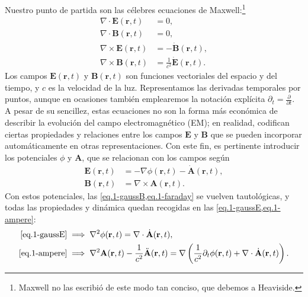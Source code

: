 Nuestro punto de partida son las célebres ecuaciones de Maxwell:\footnote{Maxwell no las escribió de este modo tan conciso, que debemos a Heaviside.}
\begin{subequations}
    \begin{align}
        \label{eq.1-gaussE}
        \nabla\cdot \mathbf{E}(\mathbf{r}, t) &= 0,\\
        \label{eq.1-gaussB}
        \nabla\cdot \mathbf{B}(\mathbf{r}, t) &= 0,\\
        \label{eq.1-faraday}
        \nabla\times \mathbf{E}(\mathbf{r}, t) &= - \dot{\mathbf{B}}(\mathbf{r}, t),\\
        \label{eq.1-ampere}
        \nabla\times \mathbf{B}(\mathbf{r}, t) &= \frac{1}{c^2}\dot{\mathbf{E}}(\mathbf{r}, t).
    \end{align}
\end{subequations}
Los campos \(\mathbf{E}(\mathbf{r}, t)\) y \(\mathbf{B}(\mathbf{r}, t)\) son funciones vectoriales del espacio y del tiempo, y \(c\) es la velocidad de la luz. Representamos las derivadas temporales por puntos, aunque en ocasiones también emplearemos la notación explícita \(\partial_t=\frac{\partial}{\partial t}\). A pesar de su sencillez, estas ecuaciones no son la forma más económica de describir la evolución del campo electromagnético (EM); en realidad, codifican ciertas propiedades y relaciones entre los campos \(\mathbf{E}\) y \(\mathbf{B}\) que se pueden incorporar automáticamente en otras representaciones. Con este fin, es pertinente introducir los potenciales \(\phi\) y \(\mathbf{A}\), que se relacionan con los campos según
\begin{subequations}
    \begin{align}
        \label{eq.1-potentialsE}
        \mathbf{E}(\mathbf{r}, t) &= -\nabla\phi(\mathbf{r}, t) - \dot{\mathbf{A}}(\mathbf{r}, t),\\
        \label{eq.1-potentialsB}
        \mathbf{B}(\mathbf{r}, t) &= \nabla\times\mathbf{A}(\mathbf{r}, t).
    \end{align}
\end{subequations}
Con estos potenciales, las \cref{eq.1-gaussB,eq.1-faraday} se vuelven tautológicas, y todas las propiedades y dinámica quedan recogidas en las \cref{eq.1-gaussE,eq.1-ampere}: 
\begin{subequations}
    \begin{align}
        \mathrm{\cref{eq.1-gaussE}}&\implies\nabla^2 \phi(\mathbf{r}, t) = \nabla\cdot\dot{\mathbf{A}}(\mathbf{r}, t),\\
        \mathrm{\cref{eq.1-ampere}}&\implies
        \nabla^2 \mathbf{A}(\mathbf{r}, t) - \frac{1}{c^2}\ddot{\mathbf{A}}(\mathbf{r}, t) =\nabla\left(\frac{1}{c^2}\partial_t\phi(\mathbf{r}, t) + \nabla\cdot\dot{\mathbf{A}}(\mathbf{r}, t)\right).
    \end{align}
\end{subequations}

